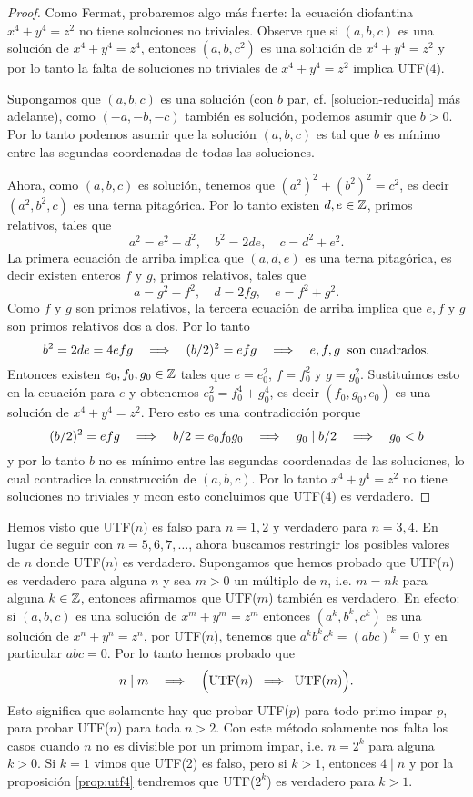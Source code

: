 \begin{proof}
Como Fermat, probaremos algo más fuerte: la ecuación diofantina $x^4+y^4=z^2$ no tiene soluciones no triviales. Observe que si $(a,b,c)$ es una solución de $x^4+y^4=z^4$, entonces $(a,b,c^2)$ es una solución de $x^4+y^4=z^2$ y por lo tanto la falta de soluciones no triviales de $x^4+y^4=z^2$ implica UTF(4).

Supongamos que $(a,b,c)$ es una solución (con $b$ par, cf. \eqref{solucion-reducida} más adelante), como $(-a,-b,-c)$ también es solución, podemos asumir que $b>0$. Por lo tanto podemos asumir que la solución $(a,b,c)$ es tal que $b$ es mínimo entre las segundas coordenadas de todas las soluciones.

Ahora, como $(a,b,c)$ es solución, tenemos que $(a^2)^2+(b^2)^2=c^2$, es decir $(a^2,b^2,c)$ es una terna pitagórica. Por lo tanto existen $d,e\in\mathbb{Z}$, primos relativos, tales que
\[
	a^2=e^2-d^2,\quad b^2=2de,\quad c=d^2+e^2.
\]
La primera ecuación de arriba implica que $(a,d,e)$ es una terna pitagórica, es decir existen enteros $f$ y $g$, primos relativos, tales que
\[
	a=g^2-f^2,\quad d=2fg,\quad e=f^2+g^2.
\]
Como $f$ y $g$ son primos relativos, la tercera ecuación de arriba implica que $e,f$ y $g$ son primos relativos dos a dos. Por lo tanto
\[
	b^2=2de=4efg \quad\Longrightarrow\quad (b/2)^2=efg \quad\Longrightarrow\quad e,f,g\;\;\text{son cuadrados}.
\]
Entonces existen $e_0,f_0,g_0\in\mathbb{Z}$ tales que $e=e_0^2$, $f=f_0^2$ y $g=g_0^2$. Sustituimos esto en la ecuación para $e$ y obtenemos $e_0^2=f_0^4+g_0^4$, es decir $(f_0,g_0,e_0)$ es una solución de $x^4+y^4=z^2$. Pero esto es una contradicción porque
\[
	(b/2)^2=efg\quad\Longrightarrow\quad b/2=e_0f_0g_0 \quad\Longrightarrow\quad g_0\mid b/2 \quad\Longrightarrow\quad g_0<b
\]
y por lo tanto $b$ no es mínimo entre las segundas coordenadas de las soluciones, lo cual contradice la construcción de $(a,b,c)$. Por lo tanto $x^4+y^4=z^2$ no tiene soluciones no triviales y mcon esto concluimos que UTF(4) es verdadero.
\end{proof}

Hemos visto que UTF($n$) es falso para $n=1,2$ y verdadero para $n=3,4$. En lugar de seguir con $n=5,6,7,\ldots$, ahora buscamos restringir los posibles valores de $n$ donde UTF($n$) es verdadero. Supongamos que hemos probado que UTF($n$) es verdadero para alguna $n$ y sea $m>0$ un múltiplo de $n$, i.e. $m=nk$ para alguna $k\in\mathbb{Z}$, entonces afirmamos que UTF($m$) también es verdadero. En efecto: si $(a,b,c)$ es una solución de $x^m+y^m=z^m$ entonces $(a^k,b^k,c^k)$ es una solución de $x^n+y^n=z^n$, por UTF($n$), tenemos que $a^kb^kc^k=(abc)^k=0$ y en particular $abc=0$. Por lo tanto hemos probado que
\[
	n\mid m \quad\Longrightarrow\quad \Big( \mathrm{UTF}(n)\;\;\Longrightarrow\;\;\mathrm{UTF}(m)\Big).
\]
Esto significa que solamente hay que probar UTF($p$) para todo primo impar $p$, para probar UTF($n$) para toda $n>2$. Con este método solamente nos falta los casos cuando $n$ no es divisible por un primom impar, i.e. $n=2^k$ para alguna $k>0$. Si $k=1$ vimos que UTF(2) es falso, pero si $k>1$, entonces $4\mid n$ y por la proposición \ref{prop:utf4} tendremos que UTF($2^k$) es verdadero para $k>1$.

